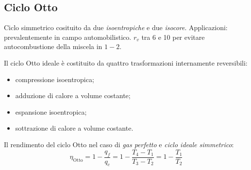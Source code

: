 \subsection{Ciclo Otto}
Ciclo simmetrico cosituito da due \emph{isoentropiche} e due \emph{isocore}.
Applicazioni: prevalentemente in campo automobilistico. $r_v$ tra 6 e 10 per evitare autocombustione della miscela in $1-2$.

\begin{minipage}{.5\linewidth}
\end{minipage}%
\begin{minipage}{.5\linewidth}
\end{minipage}

Il ciclo Otto ideale è costituito da quattro trasformazioni internamente reversibili:
\begin{itemize}
    \item compressione isoentropica;
    \item adduzione di calore a volume costante;
    \item espansione isoentropica;
    \item sottrazione di calore a volume costante.
\end{itemize}

Il rendimento del ciclo Otto nel caso di \emph{gas perfetto} e \emph{ciclo ideale simmetrico}:
\[
    \eta_{\text{Otto}} = 1 - \frac{q_f}{q_c} = 1 - \frac{T_4-T_1}{T_3-T_2} = 1 - \frac{T_1}{T_2}
\]

